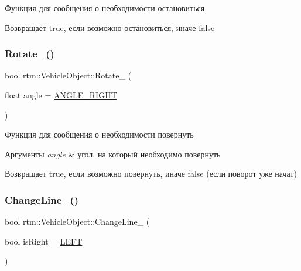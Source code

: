 Функция для сообщения о необходимости остановиться 

\begin{DoxyReturn}{Возвращает}
true, если возможно остановиться, иначе false 
\end{DoxyReturn}
\mbox{\label{classrtm_1_1_vehicle_object_a0739284311dc651679c0c5954f240758}} 
\subsubsection{\texorpdfstring{Rotate\+\_\+()}{Rotate\_()}}
{\footnotesize\ttfamily bool rtm\+::\+Vehicle\+Object\+::\+Rotate\+\_\+ (\begin{DoxyParamCaption}\item[{float}]{angle = {\ttfamily \hyperlink{namespacertm_a39212dd73aa5a6387211cf776bdb64d8}{A\+N\+G\+L\+E\+\_\+\+R\+I\+G\+HT}} }\end{DoxyParamCaption})\hspace{0.3cm}{\ttfamily [protected]}}



Функция для сообщения о необходимости повернуть 


\begin{DoxyParams}{Аргументы}
{\em angle} & угол, на который необходимо повернуть \\
\hline
\end{DoxyParams}
\begin{DoxyReturn}{Возвращает}
true, если возможно повернуть, иначе false (если поворот уже начат) 
\end{DoxyReturn}
\mbox{\label{classrtm_1_1_vehicle_object_a73ef7c4f1318bdbe2cd75dc4f07aca4e}} 
\subsubsection{\texorpdfstring{Change\+Line\+\_\+()}{ChangeLine\_()}}
{\footnotesize\ttfamily bool rtm\+::\+Vehicle\+Object\+::\+Change\+Line\+\_\+ (\begin{DoxyParamCaption}\item[{bool}]{is\+Right = {\ttfamily \hyperlink{namespacertm_a92d29773a54951290dd89f754fb39a8c}{L\+E\+FT}} }\end{DoxyParamCaption})\hspace{0.3cm}{\ttfamily [protected]}}



